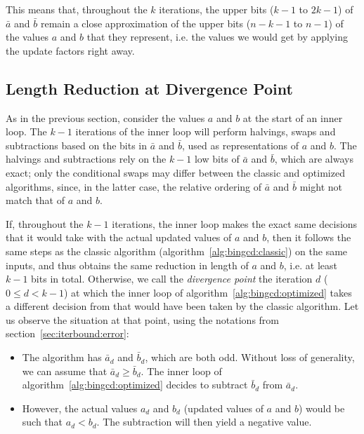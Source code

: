 \documentclass{llncs}
\begin{document}
This means that, throughout the $k$ iterations, the upper bits ($k-1$ to
$2k-1$) of $\bar a$ and $\bar b$ remain a close approximation of the
upper bits ($n-k-1$ to $n-1$) of the values $a$ and $b$ that they
represent, i.e. the values we would get by applying the update factors
right away.

\subsection{Length Reduction at Divergence Point}\label{sec:iterbound:diverge}

As in the previous section, consider the values $a$ and $b$ at the start
of an inner loop. The $k-1$ iterations of the inner loop will perform
halvings, swaps and subtractions based on the bits in $\bar a$ and $\bar
b$, used as representations of $a$ and $b$. The halvings and
subtractions rely on the $k-1$ low bits of $\bar a$ and $\bar b$, which
are always exact; only the conditional swaps may differ between the
classic and optimized algorithms, since, in the latter case, the
relative ordering of $\bar a$ and $\bar b$ might not match that of $a$
and $b$.

If, throughout the $k-1$ iterations, the inner loop makes the exact same
decisions that it would take with the actual updated values of $a$ and
$b$, then it follows the same steps as the classic algorithm
(algorithm~\ref{alg:bingcd:classic}) on the same inputs, and thus
obtains the same reduction in length of $a$ and $b$, i.e. at least $k-1$
bits in total. Otherwise, we call the \emph{divergence point} the
iteration $d$ ($0\leq d < k-1$) at which the inner loop of
algorithm~\ref{alg:bingcd:optimized} takes a different decision from
that would have been taken by the classic algorithm. Let us observe the
situation at that point, using the notations from
section~\ref{sec:iterbound:error}:

\begin{itemize}

    \item The algorithm has $\bar a_d$ and $\bar b_d$, which are both odd.
    Without loss of generality, we can assume that $\bar a_d \geq \bar b_d$.
    The inner loop of algorithm~\ref{alg:bingcd:optimized} decides to
    subtract $\bar b_d$ from $\bar a_d$.

    \item However, the actual values $a_d$ and $b_d$ (updated values of
    $a$ and $b$) would be such that $a_d < b_d$. The subtraction will
    then yield a negative value.

\end{itemize}
\end{document}
